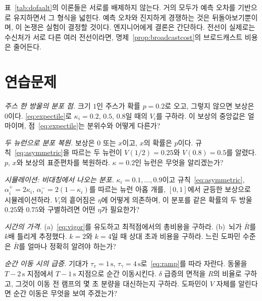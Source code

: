 표~\ref{tab:dofaalt}의 이론들은 서로를 배제하지 않는다. 거의 모두가 예측 오차를 기반으로 유지하면서 그 형식을 넓힌다. 예측 오차와 진지하게 경쟁하는 것은 뒤돌아보기뿐이며, 이 논쟁은 실험이 결정할 것이다. 엔지니어에게 결론은 간단하다. 전선이 실제로는 수신처가 서로 다른 여러 전선이라면, 명제~\ref{prop:broadcastcost}의 브로드캐스트 비용은 줄어든다.

\section{연습문제}

\begin{exercise}[\lvlA]
\label{ex:07:1}
\emph{주스 한 방울의 분포 점.} 크기 $1$인 주스가 확률 $p=0.2$로 오고, 그렇지 않으면 보상은 $0$이다. \eqref{eq:expectile}로 $\kappa_i=0.2$, $0.5$, $0.8$일 때의 $V_i$를 구하라. 이 보상의 중앙값은 얼마이며, 점~\eqref{eq:expectile}는 분위수와 어떻게 다른가?
\end{exercise}

\begin{exercise}[\lvlB]
\label{ex:07:2}
\emph{두 뉴런으로 분포 복원.} 보상은 $0$ 또는 $x$이고, $x$의 확률은 $p$이다. 규칙~\eqref{eq:asymmetric}을 따르는 두 뉴런이 $V(1/2)=0.25$와 $V(0.8)=0.5$를 알렸다. $p$, $x$와 보상의 표준편차를 복원하라. $\kappa=0.2$인 뉴런은 무엇을 알리겠는가?
\end{exercise}

\begin{exercise}[\lvlB]
\label{ex:07:3}
\emph{시뮬레이션: 비대칭에서 나오는 분포.} $\kappa_i=0.1,\dots,0.9$이고 규칙~\eqref{eq:asymmetric}, $\alpha_i^+=2\kappa_i$, $\alpha_i^-=2(1-\kappa_i)$를 따르는  뉴런 아홉 개를, $[0,1]$에서 균등한 보상으로 시뮬레이션하라. $V_i$의 흩어짐은 $\eta$에 어떻게 의존하며, 이 분포를 같은 확률의 두 방울 $0.25$와 $0.75$와 구별하려면 어떤 $\eta$가 필요한가?
\end{exercise}

\begin{exercise}[\lvlA]
\label{ex:07:4}
\emph{시간의 가격.} (a)~\eqref{eq:vigor}를 유도하고 최적점에서의 총비용을 구하라. (b)~뇌가 $\bar R$를 $k$배 틀리게 추정했다. $k=2$와 $k=4$일 때 상대 초과 비용을 구하라. 느린 도파민 수준은 $\bar R$를 얼마나 정확히 알려야 하는가?
\end{exercise}

\begin{exercise}[\lvlB]
\label{ex:07:5}
\emph{순간 이동 시의 급증.} 기대가 $\tau_v=1\,\text{s}$, $\tau_\gamma=4\,\text{s}$로~\eqref{eq:ramp}를 따라 자란다. 동물을 $T-2\,\text{s}$ 지점에서 $T-1\,\text{s}$ 지점으로 순간 이동시킨다. $\delta$ 급증의 면적을 $R$의 비율로 구하고, 그것이 이동 전 램프의 몇 초 분량을 대신하는지 구하라. 도파민이 $V$ 자체를 알린다면 순간 이동은 무엇을 보여 주겠는가?
\end{exercise}

